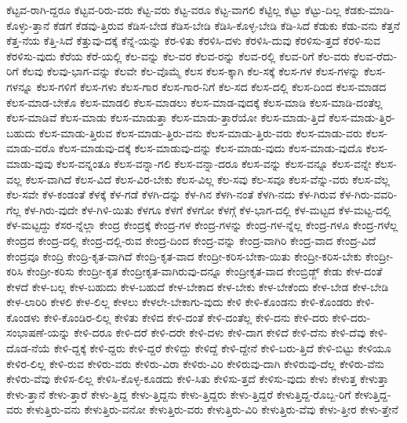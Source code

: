 {ಕೆಟ್ಟವ-ರಾಗಿ-ದ್ದರೂ
ಕೆಟ್ಟವ-ರಿರು-ವರು
ಕೆಟ್ಟ-ವರು
ಕೆಟ್ಟ-ವರೂ
ಕೆಟ್ಟ-ವಾಗಲಿ
ಕೆಟ್ಟಿಲ್ಲ
ಕೆಟ್ಟು
ಕೆಟ್ಟು-ದಿಲ್ಲ
ಕೆಡಕು-ಮಾಡಿ-ಕೊಳ್ಳು-ತ್ತಾನೆ
ಕೆಡಗೆ
ಕೆಡವು-ತ್ತಿರುವ
ಕೆಡಿಸ-ಬೇಡ
ಕೆಡಿಸ-ಬೇಡಿ
ಕೆಡಿಸಿ-ಕೊಳ್ಳ-ಬೇಡಿ
ಕೆಡಿ-ಸಿದೆ
ಕೆಡುಕು
ಕೆಡು-ವನು
ಕೆತ್ತನೆ
ಕೆತ್ತ-ನೆಯ
ಕೆತ್ತಿ-ಸಿದೆ
ಕೆತ್ತುವು-ದಕ್ಕೆ
ಕೆನ್ನೆ-ಯನ್ನು
ಕೆರ-ಳಿತು
ಕೆರಳಿಸಿ-ದಳು
ಕೆರಳಿಸಿ-ದುವು
ಕೆರಳಿಸು-ತ್ತದೆ
ಕೆರಳಿ-ಸುವ
ಕೆರಳಿಸು-ವುದು
ಕೆರೆಯ
ಕೆರೆ-ಯಲ್ಲಿ
ಕೆಲ-ವನ್ನು
ಕೆಲ-ವರ
ಕೆಲವ-ರನ್ನು
ಕೆಲವ-ರಲ್ಲಿ
ಕೆಲವ-ರಿಗೆ
ಕೆಲ-ವರು
ಕೆಲವ-ರೆದು-ರಿಗೆ
ಕೆಲವು
ಕೆಲವು-ಭಾಗ-ವನ್ನು
ಕೆಲವೇ
ಕೆಲ-ವೊಮ್ಮೆ
ಕೆಲಸ
ಕೆಲಸ-ಕ್ಕಾಗಿ
ಕೆಲ-ಸಕ್ಕೆ
ಕೆಲಸ-ಗಳ
ಕೆಲಸ-ಗಳನ್ನು
ಕೆಲಸ-ಗಳನ್ನೂ
ಕೆಲಸ-ಗಳಿಗೆ
ಕೆಲಸ-ಗಳು
ಕೆಲಸ-ಗಾರ
ಕೆಲಸ-ಗಾರ-ನಿಗೆ
ಕೆಲ-ಸದ
ಕೆಲಸ-ದಲ್ಲಿ
ಕೆಲಸ-ದಿಂದ
ಕೆಲಸ-ಮಾಡದ
ಕೆಲಸ-ಮಾಡ-ಬೇಕೊ
ಕೆಲಸ-ಮಾಡಲಿ
ಕೆಲಸ-ಮಾಡಲು
ಕೆಲಸ-ಮಾಡ-ವುದಕ್ಕೆ
ಕೆಲಸ-ಮಾಡಿ
ಕೆಲಸ-ಮಾಡಿ-ದಂತೆಲ್ಲ
ಕೆಲಸ-ಮಾಡಿವೆ
ಕೆಲಸ-ಮಾಡು
ಕೆಲಸ-ಮಾಡುತ್ತಾ
ಕೆಲಸ-ಮಾಡು-ತ್ತಾರೆಯೋ
ಕೆಲಸ-ಮಾಡು-ತ್ತಿದೆ
ಕೆಲಸ-ಮಾಡು-ತ್ತಿರ-ಬಹುದು
ಕೆಲಸ-ಮಾಡು-ತ್ತಿರುವ
ಕೆಲಸ-ಮಾಡು-ತ್ತಿರು-ವನು
ಕೆಲಸ-ಮಾಡು-ತ್ತಿರು-ವರು
ಕೆಲಸ-ಮಾಡು-ವರು
ಕೆಲಸ-ಮಾಡು-ವರೊ
ಕೆಲಸ-ಮಾಡುವು-ದಕ್ಕೆ
ಕೆಲಸ-ಮಾಡುವು-ದನ್ನು
ಕೆಲಸ-ಮಾಡು-ವುದು
ಕೆಲಸ-ಮಾಡು-ವುದೊ
ಕೆಲಸ-ಮಾಡು-ವುವು
ಕೆಲಸ-ವನ್ನಂತೂ
ಕೆಲಸ-ವನ್ನಾ-ಗಲಿ
ಕೆಲಸ-ವನ್ನಾ-ದರೂ
ಕೆಲಸ-ವನ್ನು
ಕೆಲಸ-ವನ್ನೂ
ಕೆಲಸ-ವನ್ನೇ
ಕೆಲಸ-ವಲ್ಲ
ಕೆಲಸ-ವಾಗಿದೆ
ಕೆಲಸ-ವಿದೆ
ಕೆಲಸ-ವಿರ-ಬೇಕು
ಕೆಲಸ-ವಿಲ್ಲ
ಕೆಲ-ಸವು
ಕೆಲ-ಸವೂ
ಕೆಲಸ-ವೆನ್ನು-ವರು
ಕೆಲಸ-ವೆಲ್ಲ
ಕೆಲ-ಸವೇ
ಕೆಳ-ಕಂಡಂತೆ
ಕೆಳಕ್ಕೆ
ಕೆಳ-ಗಡೆ
ಕೆಳಗಿ-ದನ್ನು
ಕೆಳ-ಗಿನ
ಕೆಳಗಿ-ನಂತೆ
ಕೆಳಗಿ-ನದು
ಕೆಳ-ಗಿರುವ
ಕೆಳ-ಗಿರು-ವವರಿ-ಗೆಲ್ಲ
ಕೆಳ-ಗಿರು-ವುದೇ
ಕೆಳ-ಗಿಳಿ-ಯಿತು
ಕೆಳಗೂ
ಕೆಳಗೆ
ಕೆಳಗೋ
ಕೆಳಗ್ಗೆ
ಕೆಳ-ಭಾಗ-ದಲ್ಲಿ
ಕೆಳ-ಮಟ್ಟದ
ಕೆಳ-ಮಟ್ಟ-ದಲ್ಲಿ
ಕೆಳ-ಮಟ್ಟದ್ದು
ಕೆಸರ-ನ್ನೆಲ್ಲಾ
ಕೇಂದ್ರ
ಕೇಂದ್ರಕ್ಕೆ
ಕೇಂದ್ರ-ಗಳ
ಕೇಂದ್ರ-ಗಳನ್ನು
ಕೇಂದ್ರ-ಗಳ-ನ್ನೆಲ್ಲ
ಕೇಂದ್ರ-ಗಳೂ
ಕೇಂದ್ರ-ಗಳೆಲ್ಲ
ಕೇಂದ್ರದ
ಕೇಂದ್ರ-ದಲ್ಲಿ
ಕೇಂದ್ರ-ದಲ್ಲಿ-ರುವ
ಕೇಂದ್ರ-ದಿಂದ
ಕೇಂದ್ರ-ವನ್ನು
ಕೇಂದ್ರ-ವಾಗಿರಿ
ಕೇಂದ್ರ-ವಾದ
ಕೇಂದ್ರ-ವಿದೆ
ಕೇಂದ್ರವೂ
ಕೇಂದ್ರಿ
ಕೇಂದ್ರಿ-ಕೃತ-ವಾಗಿದೆ
ಕೇಂದ್ರಿ-ಕೃತ-ವಾದ
ಕೇಂದ್ರೀ-ಕರಿಸ-ಬೇಕಾ-ಯಿತು
ಕೇಂದ್ರೀ-ಕರಿಸ-ಬೇಕು
ಕೇಂದ್ರೀ-ಕರಿಸಿ
ಕೇಂದ್ರೀ-ಕರಿಸು
ಕೇಂದ್ರೀ-ಕೃತ
ಕೇಂದ್ರೀಕೃತ-ವಾಗಿರುವು-ದನ್ನೂ
ಕೇಂದ್ರೀಕೃತ-ವಾದ
ಕೇಂಬ್ರಿಡ್ಜ್
ಕೇಡು
ಕೇಳ-ದಂತೆ
ಕೇಳದೆ
ಕೇಳ-ಬಲ್ಲ
ಕೇಳ-ಬಹುದು
ಕೇಳ-ಬಹುದೆ
ಕೇಳ-ಬೇಕಾದ
ಕೇಳ-ಬೇಕು
ಕೇಳ-ಬೇಕೆಂದು
ಕೇಳ-ಬೇಡ
ಕೇಳ-ಬೇಡಿ
ಕೇಳ-ಲಾರಿರಿ
ಕೇಳಲಿ
ಕೇಳ-ಲಿಲ್ಲ
ಕೇಳಲು
ಕೇಳಲೇ-ಬೇಕಾಗು-ವುದು
ಕೇಳಿ
ಕೇಳಿ-ಕೊಂಡನು
ಕೇಳಿ-ಕೊಂಡರು
ಕೇಳಿ-ಕೊಂಡಳು
ಕೇಳಿ-ಕೊಂಡಿರ-ಲಿಲ್ಲ
ಕೇಳಿತು
ಕೇಳಿದ
ಕೇಳಿ-ದಂತೆ
ಕೇಳಿ-ದಂತೆಲ್ಲ
ಕೇಳಿ-ದನು
ಕೇಳಿ-ದರು
ಕೇಳಿ-ದರು-ಸಂಭಾಷಣೆ-ಯನ್ನು
ಕೇಳಿ-ದರೂ
ಕೇಳಿ-ದರೆ
ಕೇಳಿ-ದರೇ
ಕೇಳಿ-ದಳು
ಕೇಳಿ-ದಾಗ
ಕೇಳಿದೆ
ಕೇಳಿ-ದೆನು
ಕೇಳಿ-ದೆವು
ಕೇಳಿ-ದೊಡ-ನೆಯೆ
ಕೇಳಿ-ದ್ದಕ್ಕೆ
ಕೇಳಿ-ದ್ದರು
ಕೇಳಿ-ದ್ದರೆ
ಕೇಳಿದ್ದು
ಕೇಳಿದ್ದೆ
ಕೇಳಿ-ದ್ದೇನೆ
ಕೇಳಿ-ಬರು-ತ್ತಿದೆ
ಕೇಳಿ-ಬಿಟ್ಟು
ಕೇಳಿಯೂ
ಕೇಳಿರ-ಲಿಲ್ಲ
ಕೇಳಿ-ರುವ
ಕೇಳಿರು-ವರು
ಕೇಳಿರು-ವಿರಾ
ಕೇಳಿರು-ವಿರಿ
ಕೇಳಿರುವು-ದಾಗಿ
ಕೇಳಿರುವು-ದೆಲ್ಲ
ಕೇಳಿರು-ವೆನು
ಕೇಳಿರು-ವೆವು
ಕೇಳಿಸ-ಲಿಲ್ಲ
ಕೇಳಿಸಿ-ಕೊಳ್ಳ-ಕೂಡದು
ಕೇಳಿ-ಸಿತು
ಕೇಳಿಸು-ತ್ತದೆ
ಕೇಳಿಸು-ವುದು
ಕೇಳು
ಕೇಳುತ್ತ
ಕೇಳುತ್ತಾ
ಕೇಳು-ತ್ತಾನೆ
ಕೇಳು-ತ್ತಾರೆ
ಕೇಳು-ತ್ತಿದ್ದ
ಕೇಳು-ತ್ತಿದ್ದನು
ಕೇಳು-ತ್ತಿದ್ದರು
ಕೇಳು-ತ್ತಿದ್ದರೆ
ಕೇಳುತ್ತಿದ್ದ-ರೊಬ್ಬ-ರಿಗೆ
ಕೇಳುತ್ತಿದ್ದ-ವರು
ಕೇಳುತ್ತಿರು-ವನು
ಕೇಳುತ್ತಿರು-ವನೋ
ಕೇಳುತ್ತಿರು-ವರು
ಕೇಳುತ್ತಿರು-ವಿರಿ
ಕೇಳುತ್ತಿರು-ವೆವು
ಕೇಳು-ತ್ತೀರ
ಕೇಳು-ತ್ತೇನೆ
}
